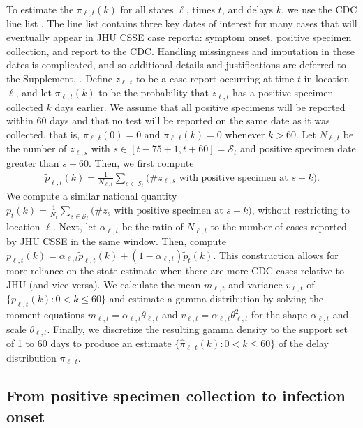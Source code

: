 To estimate the $\pi_{\ell,t}(k)$ for all states $\ell$, times $t$, and delays
$k$, we use the CDC line list \citep{cdc2020casepub,
cdc2020caserestr}. The line list contains three key dates of interest for many
cases that will eventually appear in JHU CSSE case reporta: symptom onset,
positive specimen collection, and report to the CDC. Handling missingness and
imputation in these dates is complicated, and so additional details and
justifications are deferred to the Supplement, .
Define $z_{\ell,t}$ to be a case report occurring at time $t$ in
location $\ell$, and let $\pi_{\ell,t}(k)$ to be the probability that
$z_{\ell,t}$ has a positive specimen collected $k$ days earlier. We assume that
all positive specimens will be reported within 60 days and that no test will be
reported on the same date as it was collected, that is, $\pi_{\ell,t}(0) = 0$
and $\pi_{\ell,t}(k) = 0$ whenever $k > 60$. Let $N_{\ell,t}$ be the number of
$z_{\ell,s}$ with $s\in[t-75+1,t+60] = \mathcal{S}_t$ and positive specimen date
greater than $s-60$. Then, we first compute
\begin{align}
  \label{eq:line-list-delay}
    \tilde{p}_{\ell,t}(k) = \frac{1}{N_{\ell,t}}\sum_{s \in \mathcal{S}_t}
    \big(\textrm{\# $z_{\ell,s}$ with positive specimen at $s-k$}\big).
\end{align}
We compute a similar national quantity $\tilde{p}_{t}(k) =
\frac{1}{N_{t}}\sum_{s \in \mathcal{S}_t} \big(\textrm{\# $z_{s}$ with positive
specimen at $s-k$}\big)$, without restricting to location $\ell$. Next, let
$\alpha_{\ell,t}$ be the ratio of $N_{\ell,t}$ to the number of cases reported
by JHU CSSE\cite{dong2020interactive} in the same window. Then, compute
$p_{\ell,t}(k) = \alpha_{\ell,t}\tilde{p}_{\ell,t}(k) +
(1-\alpha_{\ell,t})\tilde{p}_t(k)$. This construction allows for more reliance
on the state estimate when there are more CDC cases relative to JHU (and vice
versa). We calculate the mean $m_{\ell,t}$ and variance $v_{\ell,t}$ of
$\{p_{\ell,t}(k) : 0<k\leq 60\}$ and estimate a gamma distribution by solving
the moment equations $m_{\ell,t} = \alpha_{\ell,t}\theta_{\ell,t}$ and
$v_{\ell,t}= \alpha_{\ell,t}\theta_{\ell,t}^2$ for the shape $\alpha_{\ell,t}$
and scale $\theta_{\ell,t}$. Finally, we discretize the resulting gamma density
to the support set of 1 to 60 days to produce an estimate
$\{\widehat{\pi}_{\ell,t}(k): 0 < k \leq 60\}$ of the delay distribution
$\pi_{\ell,t}$.
 
\subsection{From positive specimen collection to infection onset}
\label{sec:step2-and-3}

